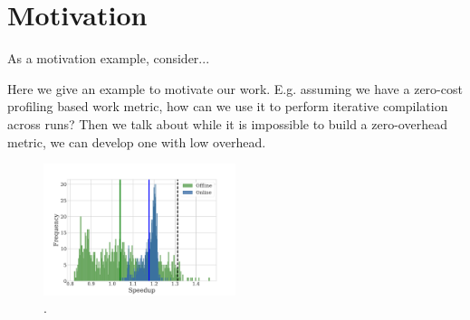 \section{Motivation}

As a motivation example, consider...

Here we give an example to motivate our work. E.g. assuming we have a zero-cost profiling based work metric,
how can we use it to perform iterative compilation across runs? Then we talk about while it is impossible to
build a zero-overhead metric, we can develop one with low overhead.


\begin{figure}[ht]
    \centering
    \includegraphics[width=0.5\textwidth]{figs/motivation.pdf}
    \caption{.}
    \label{fig:motivation}
\end{figure}
